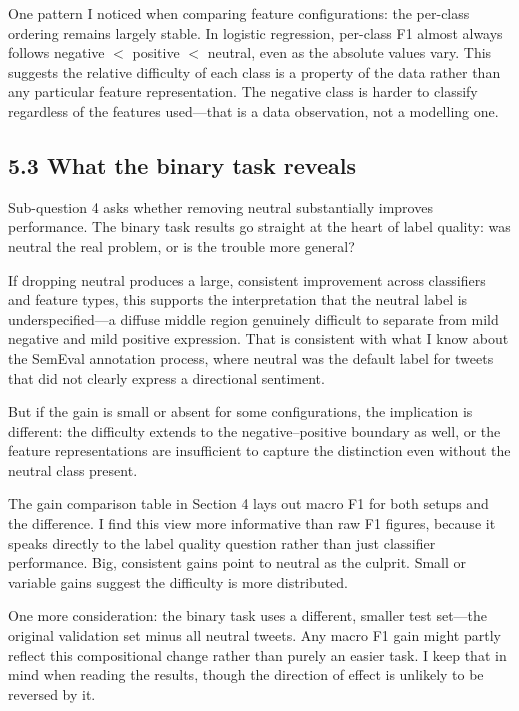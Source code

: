 \documentclass[12pt]{article}
\begin{document}
One pattern I noticed when comparing feature configurations: the per-class ordering remains largely stable. In logistic regression, per-class F1 almost always follows negative $<$ positive $<$ neutral, even as the absolute values vary. This suggests the relative difficulty of each class is a property of the data rather than any particular feature representation. The negative class is harder to classify regardless of the features used---that is a data observation, not a modelling one.



\subsection*{5.3 What the binary task reveals}



Sub-question 4 asks whether removing neutral substantially improves performance. The binary task results go straight at the heart of label quality: was neutral the real problem, or is the trouble more general?

If dropping neutral produces a large, consistent improvement across classifiers and feature types, this supports the interpretation that the neutral label is underspecified---a diffuse middle region genuinely difficult to separate from mild negative and mild positive expression. That is consistent with what I know about the SemEval annotation process, where neutral was the default label for tweets that did not clearly express a directional sentiment.

But if the gain is small or absent for some configurations, the implication is different: the difficulty extends to the negative--positive boundary as well, or the feature representations are insufficient to capture the distinction even without the neutral class present.

The gain comparison table in Section 4 lays out macro F1 for both setups and the difference. I find this view more informative than raw F1 figures, because it speaks directly to the label quality question rather than just classifier performance. Big, consistent gains point to neutral as the culprit. Small or variable gains suggest the difficulty is more distributed.

One more consideration: the binary task uses a different, smaller test set---the original validation set minus all neutral tweets. Any macro F1 gain might partly reflect this compositional change rather than purely an easier task. I keep that in mind when reading the results, though the direction of effect is unlikely to be reversed by it.
\end{document}
